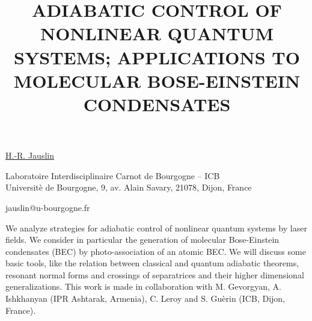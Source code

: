 \title{ADIABATIC CONTROL OF NONLINEAR QUANTUM SYSTEMS; APPLICATIONS TO MOLECULAR BOSE-EINSTEIN CONDENSATES}

\underline{H.-R. Jauslin}

{\normalsize{
\vspace{-4mm} Laboratoire Interdisciplinaire Carnot de Bourgogne -- ICB\\
Universit\`{e} de Bourgogne, 9, av. Alain Savary, 21078, Dijon, France


\email jauslin@u-bourgogne.fr}}

We analyze strategies for adiabatic control of nonlinear quantum systems by laser fields. We consider in particular the generation of
molecular Bose-Einstein condensates (BEC) by photo-association of an atomic BEC. We will discuss some basic tools, like the relation
between classical and quantum adiabatic theorems, resonant normal forms and crossings of separatrices and their higher
dimensional generalizations. This work is made in collaboration with M. Gevorgyan, A. Ishkhanyan (IPR Ashtarak, Armenia), C. Leroy and S. Gu\`{e}rin (ICB, Dijon,
France).

\vspace{\baselineskip}
